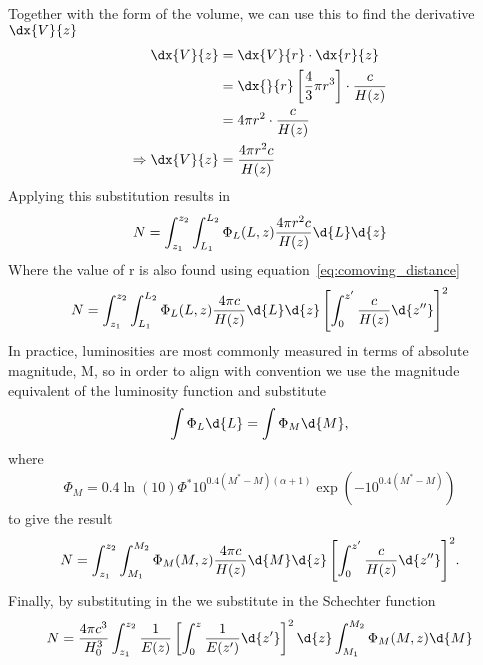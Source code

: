 		Together with the form of the volume, we can use this to find the derivative $\dx{V}{z}$
		\begin{align}
			\dx{V}{z} &= \dx{V}{r} \cdot \dx{r}{z} \\
		 			&= \dx{}{r} \left[\frac{4}{3} \pi r^3 \right ] \cdot \frac{c}{H(z)}\\
					&= 4 \pi r^2 \cdot \frac{c}{H(z)} \\
					\Rightarrow	\dx{V}{z}	&= \frac{4 \pi r^2 c}{H(z)}
		\end{align}
		Applying this substitution results in
		\begin{align}
					N = \int_{z_1}^{z_2} \int_{L_1}^{L_2} \Phi_L(L,z) \frac{4 \pi r^2 c}{H(z)} \d{L}\d{z}
		\end{align}
		Where the value of r is also found using equation~\ref{eq:comoving_distance}
		\begin{align}
			N = \int_{z_1}^{z_2} \int_{L_1}^{L_2} \Phi_L(L,z) \frac{4 \pi c}{H(z)}\d{L}\d{z} \left[ \int_0^{z'}\frac{c }{H(z)} \d{z''} \right ]^2
		\end{align}
		In practice, luminosities are most commonly measured in terms of absolute magnitude, M, so in order to align with convention we use the magnitude equivalent of the luminosity function and substitute
		\begin{align}
			\int \Phi_L \d{L} = \int \Phi_M\d{M} ,
		\end{align}
		where
		\begin{align}
			\Phi_M = 0.4 \ln(10) \Phi^* 10^{0.4(M^*-M)(\alpha+1)} \exp(-10^{0.4(M^*-M)})
		\end{align}
		to give the result
		\begin{align}
			N = \int_{z_1}^{z_2} {\int_{M_1}^{M_2} { \Phi_M(M,z) \frac{4 \pi c}{H(z)} \d{M} \d{z} \left[ \int_0^{z'}{\frac{c }{H(z)} \d{z''}}\right ]^2} } .
		\end{align}
		Finally, by substituting in the we substitute in the Schechter function
		\begin{align}
					N = \frac{4 \pi c^3}{H_0^3} \int_{z_1}^{z_2}  \frac{1}{E(z)} \left[ \int_0^{z}{\frac{1}{E(z')} \d{z'} }\right ]^2 \d{z} \int_{M_1}^{M_2} \Phi_M(M,z) \d{M}
		\end{align}


